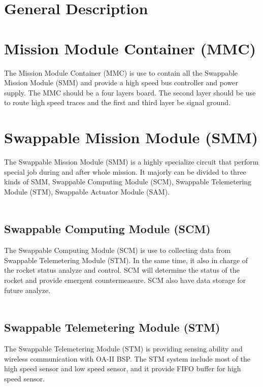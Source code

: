\documentclass[12pt,article]{memoir}
\begin{document}
\section{General Description}
\section{Mission Module Container (MMC)}
The Mission Module Container (MMC) is use to contain all the Swappable Mission Module (SMM) and provide a high speed bus controller and power supply. The MMC should be a four layers board. The second layer should be use to route high speed traces and the first and third layer be signal ground.
\section{Swappable Mission Module (SMM)}
The Swappable Mission Module (SMM) is a highly specialize circuit that perform special job during and after whole mission. It majorly can be divided to three kinds of SMM, Swappable Computing Module (SCM), Swappable Telemetering Module (STM), Swappable Actuator Module (SAM).\\\\
\subsection{Swappable Computing Module (SCM)}
The Swappable Computing Module (SCM) is use to collecting data from Swappable Telemetering Module (STM). In the same time, it also in charge of the rocket status analyze and control. SCM will determine the status of the rocket and provide emergent countermeasure. SCM also have data storage for future analyze.\\\\
\subsection{Swappable Telemetering Module (STM)}
The Swappable Telemetering Module (STM) is providing sensing ability and wireless communication with OA-II BSP. The STM system include most of the high speed sensor and low speed sensor, and it provide FIFO buffer for high speed sensor.\\\\
\end{document}
